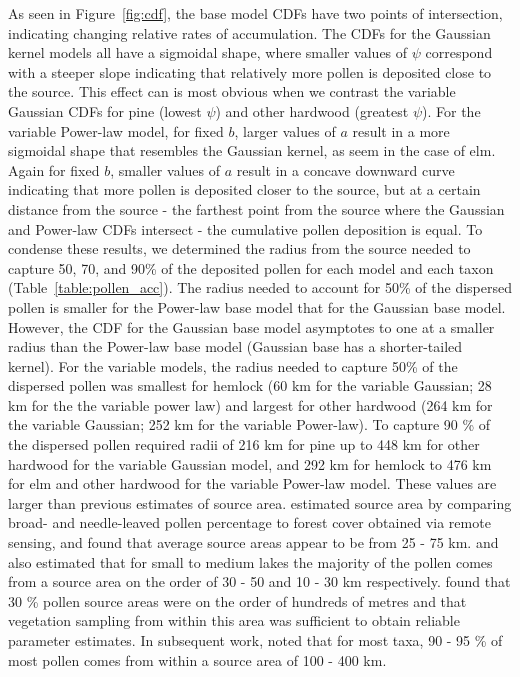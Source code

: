 \documentclass[12pt]{article}
\begin{document}
As seen in Figure~\ref{fig:cdf}, the base model CDFs have two points
of intersection, indicating changing relative rates of
accumulation. The CDFs for the Gaussian kernel models all have a
sigmoidal shape, where smaller values of $\psi$ correspond with a
steeper slope indicating that relatively more pollen is deposited
close to the source. This effect can is most obvious when we contrast
the variable Gaussian CDFs for pine (lowest $\psi$) and other hardwood
(greatest $\psi$). For the variable Power-law model, for fixed $b$,
larger values of $a$ result in a more sigmoidal shape that resembles
the Gaussian kernel, as seem in the case of elm. Again for fixed $b$,
smaller values of $a$ result in a concave downward curve indicating
that more pollen is deposited closer to the source, but at a certain
distance from the source - the farthest point from the source where
the Gaussian and Power-law CDFs intersect - the cumulative pollen
deposition is equal. To condense these results, we determined the
radius from the source needed to capture 50, 70, and 90\% of the
deposited pollen for each model and each taxon
(Table~\ref{table:pollen_acc}). The radius needed to account for 50\%
of the dispersed pollen is smaller for the Power-law base model that
for the Gaussian base model. However, the CDF for the Gaussian base
model asymptotes to one at a smaller radius than the Power-law base
model (Gaussian base has a shorter-tailed kernel). For the variable
models, the radius needed to capture 50\% of the dispersed pollen was
smallest for hemlock (60 km for the variable Gaussian; 28 km for the
the variable power law) and largest for other hardwood (264 km for the
variable Gaussian; 252 km for the variable Power-law). To capture 90
\% of the dispersed pollen required radii of 216 km for pine up to 448
km for other hardwood for the variable Gaussian model, and 292 km for
hemlock to 476 km for elm and other hardwood for the variable
Power-law model. These values are larger than previous estimates of
source area. \citet{williams2003palynological} estimated source area
by comparing broad- and needle-leaved pollen percentage to forest
cover obtained via remote sensing, and found that average source areas
appear to be from 25 - 75 km. \citet{prentice1987quantitative} and
\citet{bradshaw1985relationships} also estimated that for small to
medium lakes the majority of the pollen comes from a source area on
the order of 30 - 50 and 10 - 30 km
respectively. \citet{sugita1994pollen} found that 30 \% pollen source
areas were on the order of hundreds of metres and that vegetation
sampling from within this area was sufficient to obtain reliable
parameter estimates. In subsequent work, \citet{sugita2007theory2}
noted that for most taxa, 90 - 95 \% of most pollen comes from within
a source area of 100 - 400 km.
\end{document}
